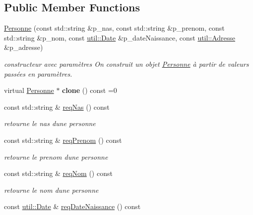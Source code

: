 \subsection*{Public Member Functions}
\begin{DoxyCompactItemize}
\item 
\hyperlink{classelections_1_1Personne_a25e4a5ff2a6b2fd79d146510b0d4622f}{Personne} (const std\+::string \&p\+\_\+nas, const std\+::string \&p\+\_\+prenom, const std\+::string \&p\+\_\+nom, const \hyperlink{classutil_1_1Date}{util\+::\+Date} \&p\+\_\+date\+Naissance, const \hyperlink{classutil_1_1Adresse}{util\+::\+Adresse} \&p\+\_\+adresse)
\begin{DoxyCompactList}\small\item\em constructeur avec paramètres On construit un objet \hyperlink{classelections_1_1Personne}{Personne} à partir de valeurs passées en paramètres. \end{DoxyCompactList}\item 
\mbox{\label{classelections_1_1Personne_a5797ace33d89a69dcc87420833affa3a}} 
virtual \hyperlink{classelections_1_1Personne}{Personne} $\ast$ {\bfseries clone} () const =0
\item 
const std\+::string \& \hyperlink{classelections_1_1Personne_af822cf5097138148a8ecdc4312521743}{req\+Nas} () const
\begin{DoxyCompactList}\small\item\em retourne le nas d\textquotesingle{}une personne \end{DoxyCompactList}\item 
const std\+::string \& \hyperlink{classelections_1_1Personne_a308b2c6b55cf3d0f414ba5c19873169f}{req\+Prenom} () const
\begin{DoxyCompactList}\small\item\em retourne le prenom d\textquotesingle{}une personne \end{DoxyCompactList}\item 
const std\+::string \& \hyperlink{classelections_1_1Personne_a46cfdb57aa5d46c54b3a8c2860ca2e30}{req\+Nom} () const
\begin{DoxyCompactList}\small\item\em retourne le nom d\textquotesingle{}une personne \end{DoxyCompactList}\item 
const \hyperlink{classutil_1_1Date}{util\+::\+Date} \& \hyperlink{classelections_1_1Personne_a32ff2a825ffb56f8159b6b618a8c897d}{req\+Date\+Naissance} () const

\end{DoxyCompactItemize}
